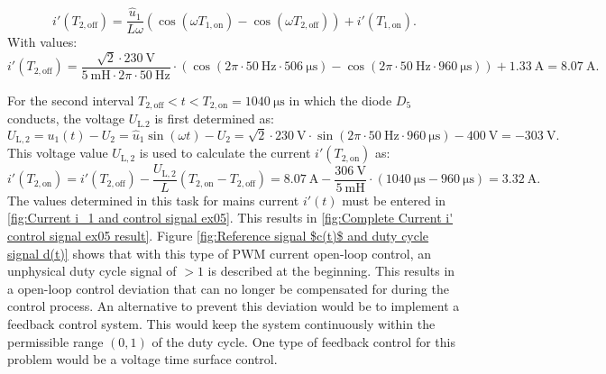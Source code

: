 \begin{solutionblock}
     \begin{equation}
        i'(T_\mathrm{2,off}) = \frac{\hat u_\mathrm{1}}{L \omega}(\cos (\omega T_\mathrm{1,on})- \cos(\omega T_\mathrm{2,off}))+ i'(T_\mathrm{1,on}).
    \end{equation}
    With values:
    \begin{equation}
        i'(T_\mathrm{2,off}) = \frac{\sqrt{2}\cdot\SI{230}{\volt}}{\SI{5}{\milli\henry}\cdot 2\pi \cdot \SI{50}{\hertz}}\cdot (\cos(2\pi \cdot \SI{50}{\hertz}\cdot \SI{506}{\micro\s})-\cos(2\pi \cdot \SI{50}{\hertz} \cdot \SI{960}{\micro\s})) + \SI{1.33}{\ampere}= \SI{8.07}{\ampere}.
     \end{equation}

     For the second interval $T_\mathrm{2,off} < t < T_\mathrm{2,on} = \SI{1040}{\micro\s}$ in which the diode $D_\mathrm{5}$ conducts, the voltage $U_\mathrm{L.2}$ is first determined as:
     \begin{equation}
        U_\mathrm{L,2} = u_\mathrm{1}(t) - U_\mathrm{2}= \hat u_\mathrm{1} \sin(\omega t) - U_\mathrm{2} = \sqrt{2} \cdot \SI{230}{\volt} \cdot \sin(2\pi \cdot \SI{50}{\hertz}\cdot \SI{960}{\micro\s}) - \SI{400}{\volt} = -\SI{303}{\volt}.
    \end{equation}
    This voltage value  $U_\mathrm{L,2}$ is used to calculate the current  $i'(T_\mathrm{2,on})$ as:
    \begin{equation}
        i'(T_\mathrm{2,on}) = i'(T_\mathrm{2,off}) -\frac{ U_\mathrm{L,2}}{L}(T_\mathrm{2,on}-T_\mathrm{2,off}) = \SI{8.07}{\ampere} -\frac{\SI{306}{\volt}}{\SI{5}{\milli\henry}}\cdot (\SI{1040}{\micro\s}-\SI{960}{\micro\s}) = \SI{3.32}{\ampere}.
    \end{equation}
    The values determined in this task for mains current
    $i'(t)$ must be entered in \autoref{fig:Current i_1 and control signal ex05}. This results in \autoref{fig:Complete Current i' control signal ex05 result}. Figure \autoref{fig:Reference signal $c(t)$ and duty cycle signal d(t)} shows that with this type of PWM current open-loop control, an unphysical duty cycle signal of $>1$ is described at the beginning. This results in a open-loop control deviation that can no longer be compensated for during the control process. An alternative to prevent this deviation would be to implement a feedback control system. This would keep the system continuously within the permissible range $(0,1)$ of the duty cycle. One type of feedback control for this problem would be a voltage time surface control. 
\end{solutionblock}

